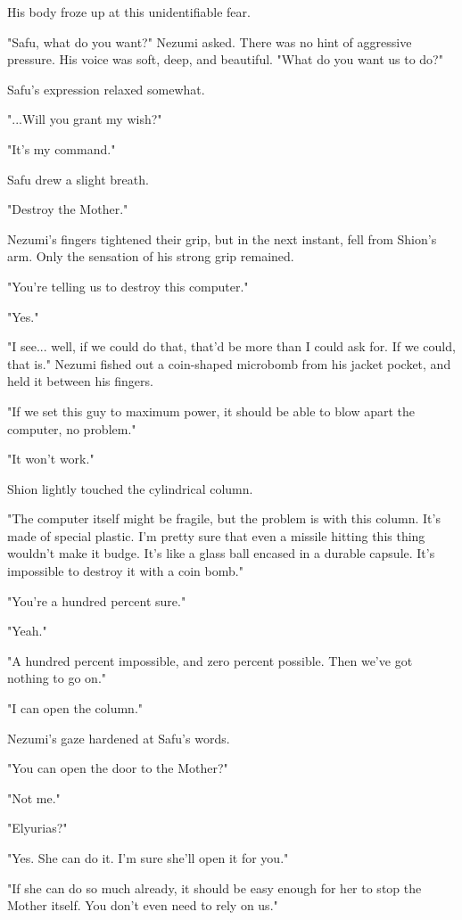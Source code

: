 His body froze up at this unidentifiable fear.

"Safu, what do you want?" Nezumi asked. There was no hint of aggressive
pressure. His voice was soft, deep, and beautiful. "What do you want us
to do?"

Safu's expression relaxed somewhat.

"...Will you grant my wish?"

"It's my command."

Safu drew a slight breath.

"Destroy the Mother."

Nezumi's fingers tightened their grip, but in the next instant, fell
from Shion's arm. Only the sensation of his strong grip remained.

"You're telling us to destroy this computer."

"Yes."

"I see... well, if we could do that, that'd be more than I could ask
for. If we could, that is." Nezumi fished out a coin-shaped microbomb
from his jacket pocket, and held it between his fingers.

"If we set this guy to maximum power, it should be able to blow apart
the computer, no problem."

"It won't work."

Shion lightly touched the cylindrical column.

"The computer itself might be fragile, but the problem is with this
column. It's made of special plastic. I'm pretty sure that even a
missile hitting this thing wouldn't make it budge. It's like a glass
ball encased in a durable capsule. It's impossible to destroy it with a
coin bomb."

"You're a hundred percent sure."

"Yeah."

"A hundred percent impossible, and zero percent possible. Then we've got
nothing to go on."

"I can open the column."

Nezumi's gaze hardened at Safu's words.

"You can open the door to the Mother?"

"Not me."

"Elyurias?"

"Yes. She can do it. I'm sure she'll open it for you."

"If she can do so much already, it should be easy enough for her to stop
the Mother itself. You don't even need to rely on us."

